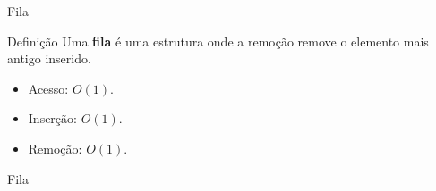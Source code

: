 \begin{frame}{Fila}

    \begin{block}{Definição}
        Uma {\bf fila} é uma estrutura onde a remoção remove o elemento mais antigo inserido.
    \end{block}

    \begin{itemize}
        \item Acesso: $O(1)$.
        \item Inserção: $O(1)$.
        \item Remoção: $O(1)$.
    \end{itemize}

    \begin{block}{Fila}
        \footnotesize
        \inputminted{cpp}{codigos/fila.cpp}    
    \end{block}
    

\end{frame}

